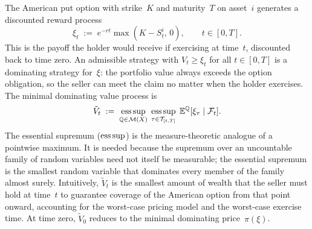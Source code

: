 The American put option with strike~$K$ and maturity~$T$ on asset~$i$
generates a discounted reward process
\begin{equation}
\label{eq:american_reward}
\xi_t \;:=\; e^{-rt}\max(K - S^i_t,\, 0),
\qquad t \in [0, T].
\end{equation}
This is the payoff the holder would receive if exercising at time~$t$,
discounted back to time zero.  An admissible strategy with
$V_t \ge \xi_t$ for all $t \in [0,T]$ is a dominating strategy
for~$\xi$: the portfolio value always exceeds the option obligation, so
the seller can meet the claim no matter when the holder exercises.  The
minimal dominating value process is
\begin{equation}
\label{eq:value_process}
\tilde{V}_t
\;:=\;
\operatorname*{ess\,sup}_{\mathbb{Q} \in \mathcal{M}(X)}
\;\operatorname*{ess\,sup}_{\tau \in \mathcal{T}_{[t,T]}}
\;\mathbb{E}^{\mathbb{Q}}[\xi_\tau \mid \mathcal{F}_t].
\end{equation}
The essential supremum ($\operatorname*{ess\,sup}$) is the measure-theoretic analogue of a
pointwise maximum.  It is needed because the supremum over an uncountable
family of random variables need not itself be measurable; the essential
supremum is the smallest random variable that dominates every member of
the family almost surely.  Intuitively, $\tilde{V}_t$ is the smallest
amount of wealth that the seller must hold at time~$t$ to guarantee
coverage of the American option from that point onward, accounting for the
worst-case pricing model and the worst-case exercise time.  At time zero,
$\tilde{V}_0$ reduces to the minimal dominating price~$\pi(\xi)$.

